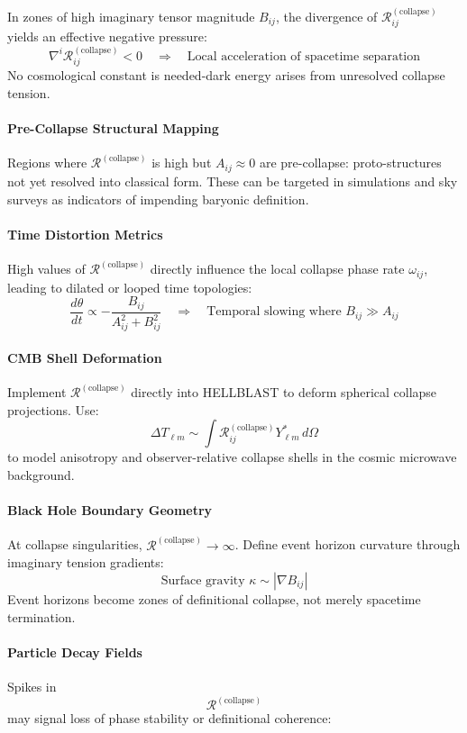 In zones of high imaginary tensor magnitude \( B_{ij} \), the divergence of \( \mathcal{R}^{(\text{collapse})}_{ij} \) yields an effective negative pressure:
\[
\nabla^i \mathcal{R}^{(\text{collapse})}_{ij} < 0 \quad \Rightarrow \quad \text{Local acceleration of spacetime separation}
\]
No cosmological constant is needed-dark energy arises from unresolved collapse tension. \cite{imaginary_meta} \paragraph{Pre-Collapse Structural Mapping}
Regions where \( \mathcal{R}^{(\text{collapse})} \) is high but \( A_{ij} \approx 0 \) are pre-collapse: proto-structures not yet resolved into classical form. \cite{imaginary_meta} These can be targeted in simulations and sky surveys as indicators of impending baryonic definition. \paragraph{Time Distortion Metrics}
High values of \( \mathcal{R}^{(\text{collapse})} \) directly influence the local collapse phase rate \( \omega_{ij} \), leading to dilated or looped time topologies:
\[
\frac{d\theta}{dt} \propto - \frac{B_{ij}}{A_{ij}^2 + B_{ij}^2} \quad \Rightarrow \quad \text{Temporal slowing where } B_{ij} \gg A_{ij}
\]

\paragraph{CMB Shell Deformation}
Implement \( \mathcal{R}^{(\text{collapse})} \) directly into HELLBLAST to deform spherical collapse projections. \cite{imaginary_meta} Use:
\[
\Delta T_{\ell m} \sim \int \mathcal{R}^{(\text{collapse})}_{ij} Y^*_{\ell m} \, d\Omega
\]
to model anisotropy and observer-relative collapse shells in the cosmic microwave background. \cite{imaginary_meta} \paragraph{Black Hole Boundary Geometry}
At collapse singularities, \( \mathcal{R}^{(\text{collapse})} \to \infty \). \cite{imaginary_meta} Define event horizon curvature through imaginary tension gradients:
\[\text{Surface gravity } \kappa \sim |\nabla B_{ij}|\]
Event horizons become zones of definitional collapse, not merely spacetime termination. \cite{imaginary_meta} \paragraph{Particle Decay Fields}
Spikes in \[ \mathcal{R}^{(\text{collapse})} \] may signal loss of phase stability or definitional coherence:

